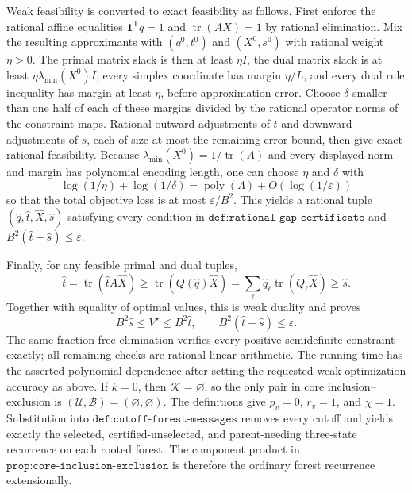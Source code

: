 Weak feasibility is converted to exact feasibility as follows.  First enforce the rational affine equalities \(\mathbf 1^{\mathsf T}q=1\) and \(\operatorname{tr}(AX)=1\) by rational elimination.  Mix the resulting approximants with \((q^0,t^0)\) and \((X^0,s^0)\) with rational weight \(\eta>0\).  The primal matrix slack is then at least \(\eta I\), the dual matrix slack is at least \(\eta\lambda_{\min}(X^0)I\), every simplex coordinate has margin \(\eta/L\), and every dual rule inequality has margin at least \(\eta\), before approximation error.  Choose \(\delta\) smaller than one half of each of these margins divided by the rational operator norms of the constraint maps.  Rational outward adjustments of \(t\) and downward adjustments of \(s\), each of size at most the remaining error bound, then give exact rational feasibility.  Because \(\lambda_{\min}(X^0)=1/\operatorname{tr}(A)\) and every displayed norm and margin has polynomial encoding length, one can choose \(\eta\) and \(\delta\) with
\[
 \log(1/\eta)+\log(1/\delta)
 =\operatorname{poly}(\Lambda)+O(\log(1/\varepsilon))
\]
so that the total objective loss is at most \(\varepsilon/B^2\).  This yields a rational tuple \((\widehat q,\widehat t,\widehat X,\widehat s)\) satisfying every condition in \(\texttt{def:rational-gap-certificate}\) and \(B^2(\widehat t-\widehat s)\le\varepsilon\).

Finally, for any feasible primal and dual tuples,
\[
 \widehat t
 =\operatorname{tr}(\widehat tA\widehat X)
 \ge\operatorname{tr}(Q(\widehat q)\widehat X)
 =\sum_\ell\widehat q_\ell\operatorname{tr}(Q_\ell\widehat X)
 \ge\widehat s.
\]
Together with equality of optimal values, this is weak duality and proves
\[
 B^2\widehat s\le V^\star\le B^2\widehat t,
 \qquad B^2(\widehat t-\widehat s)\le\varepsilon.
\]
The same fraction-free elimination verifies every positive-semidefinite constraint exactly; all remaining checks are rational linear arithmetic.  The running time has the asserted polynomial dependence after setting the requested weak-optimization accuracy as above.
If \(k=0\), then \(\mathcal K=\varnothing\), so the only pair in core inclusion--exclusion is \((\mathcal U,\mathcal B)=(\varnothing,\varnothing)\).  The definitions give \(p_v=0\), \(r_v=1\), and \(\chi=1\).  Substitution into \(\texttt{def:cutoff-forest-messages}\) removes every cutoff and yields exactly the selected, certified-unselected, and parent-needing three-state recurrence on each rooted forest.  The component product in \(\texttt{prop:core-inclusion-exclusion}\) is therefore the ordinary forest recurrence extensionally.


